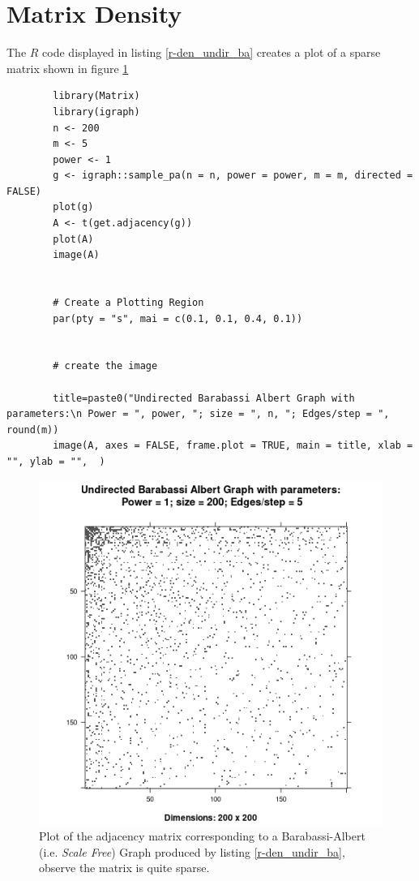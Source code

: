 \documentclass[11pt, twoside]{report}
\begin{document}
\section{Matrix Density}
The \(\mathbf{\mathit{R}}\) code displayed in listing \ref{r-den_undir_ba} creates a plot of a sparse matrix shown in figure \ref{fig:den_undir_ba}
\begin{listing}[htbp]
    \begin{tcolorbox}
        \begin{verbatim}
        library(Matrix)
        library(igraph)
        n <- 200
        m <- 5
        power <- 1
        g <- igraph::sample_pa(n = n, power = power, m = m, directed = FALSE)
        plot(g)
        A <- t(get.adjacency(g))
        plot(A)
        image(A)


        # Create a Plotting Region
        par(pty = "s", mai = c(0.1, 0.1, 0.4, 0.1))


        # create the image

        title=paste0("Undirected Barabassi Albert Graph with parameters:\n Power = ", power, "; size = ", n, "; Edges/step = ", round(m))
        image(A, axes = FALSE, frame.plot = TRUE, main = title, xlab = "", ylab = "",  )
        \end{verbatim}
    \end{tcolorbox}
\caption{\label{r-den_undir_ba}\textbf{\emph{R}} code to produce an image illustrating the density of a simulated Barabassi-Albert graph, the \emph{Barabassi-Albert} graph is a good analogue for the link structure of the internet \cite{langvilleGooglePageRankScience2012,barabasiPhysicsWeb2001,barabasiScalefreeCharacteristicsRandom2000} see the output in figure \ref{fig:den_undir_ba}}
\end{listing}

\begin{figure}[htbp]
\centering
\includegraphics[width=12cm]{media/DensityUndirectedBA.png}
\caption{\label{fig:den_undir_ba}Plot of the adjacency matrix corresponding to a Barabassi-Albert (i.e. \emph{Scale Free}) Graph produced by listing \ref{r-den_undir_ba}, observe the matrix is quite sparse.}
\end{figure}
\end{document}
